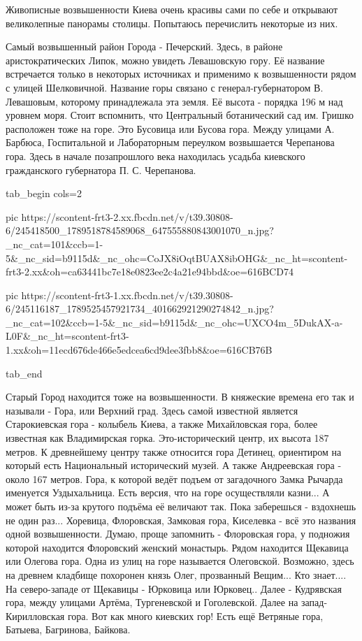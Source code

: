 Живописные возвышенности Киева очень красивы сами по себе и открывают
великолепные панорамы столицы. Попытаюсь перечислить некоторые из них. 

Самый возвышенный район Города - Печерский. Здесь, в районе аристократических
Липок, можно увидеть Левашовскую гору. Её название встречается только в
некоторых источниках и применимо к возвышенности рядом с улицей Шелковичной.
Название горы связано с генерал-губернатором В. Левашовым, которому
принадлежала эта земля. Её высота - порядка 196 м над уровнем моря. Стоит
вспомнить, что Центральный ботанический сад им. Гришко расположен тоже на горе.
Это Бусовица или Бусова гора. Между улицами А. Барбюса, Госпитальной и
Лабораторным переулком возвышается Черепанова гора. Здесь в начале позапрошлого
века находилась усадьба киевского гражданского губернатора П. С. Черепанова. 

\ifcmt
  tab_begin cols=2

     pic https://scontent-frt3-2.xx.fbcdn.net/v/t39.30808-6/245418500_1789518784589068_647555880843001070_n.jpg?_nc_cat=101&ccb=1-5&_nc_sid=b9115d&_nc_ohc=CoJX8iOqtBUAX8ibOHG&_nc_ht=scontent-frt3-2.xx&oh=ca63441bc7e18e0823ee2c4a21e94bbd&oe=616BCD74

     pic https://scontent-frt3-1.xx.fbcdn.net/v/t39.30808-6/245116187_1789525457921734_401662921290274842_n.jpg?_nc_cat=102&ccb=1-5&_nc_sid=b9115d&_nc_ohc=UXCO4m_5DukAX-a-L0F&_nc_ht=scontent-frt3-1.xx&oh=11ecd676de466e5edcea6cd9dee3fbb8&oe=616CB76B

  tab_end
\fi

Старый Город находится тоже на возвышенности. В
княжеские времена его так и называли - Гора, или Верхний град. Здесь самой
известной является Старокиевская гора - колыбель Киева, а также Михайловская
гора, более известная как Владимирская горка. Это-исторический центр, их высота
187 метров. К древнейшему центру также относится гора Детинец, ориентиром на
который есть Национальный исторический музей. А также Андреевская гора - около 167
метров. Гора, к которой ведёт подъем от загадочного Замка Рычарда именуется
Уздыхальница. Есть версия, что на горе осуществляли казни... А может быть из-за
крутого подъёма её величают так. Пока заберешься - вздохнешь не один
раз... Хоревица, Флоровская, Замковая гора, Киселевка - всё это названия одной
возвышенности. Думаю, проще запомнить - Флоровская гора, у подножия которой
находится Флоровский  женский монастырь. Рядом находится Щекавица или Олегова
гора. Одна из улиц на горе называется Олеговской. Возможно, здесь на древнем
кладбище похоронен князь Олег, прозванный Вещим... Кто знает.... На северо-западе
от Щекавицы - Юрковица или Юрковец.. Далее - Кудрявская гора, между улицами
Артёма, Тургеневской и Гоголевской. Далее на запад-Кирилловская гора. Вот как
много киевских гор! Есть ещё Ветряные гора, Батыева, Багринова, Байкова. 

